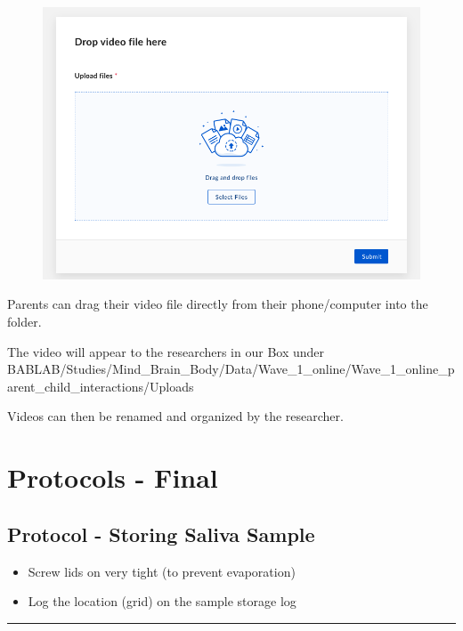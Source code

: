 \documentclass[]{book}
\begin{document}
\begin{figure}
\centering
\includegraphics{images/zoom_parent_child_interaction/13.png}
\caption{}
\end{figure}

Parents can drag their video file directly from their phone/computer into the folder.

The video will appear to the researchers in our Box under BABLAB/Studies/Mind\_Brain\_Body/Data/Wave\_1\_online/Wave\_1\_online\_parent\_child\_interactions/Uploads

Videos can then be renamed and organized by the researcher.

\hypertarget{protocols---final-2}{%
\section{Protocols - Final}\label{protocols---final-2}}

\hypertarget{protocol---storing-saliva-sample-2}{%
\subsection{Protocol - Storing Saliva Sample}\label{protocol---storing-saliva-sample-2}}

\begin{itemize}
\item
  Screw lids on very tight (to prevent evaporation)
\item
  Log the location (grid) on the sample storage log
\end{itemize}

\begin{center}\rule{0.5\linewidth}{0.5pt}\end{center}
\end{document}
